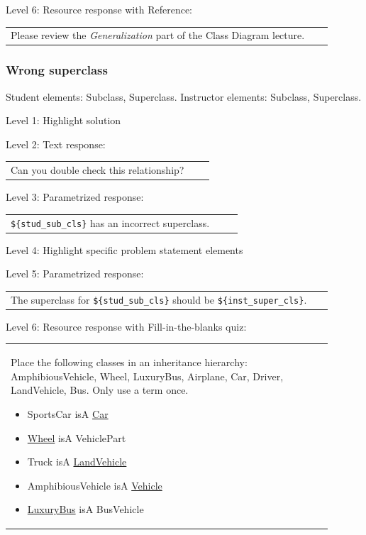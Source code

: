 \noindent Level 6: Resource response with Reference: \medskip

\begin{tabular}{|p{0.9\linewidth}}
Please review the \textit{Generalization} part of the Class Diagram lecture.
\end{tabular} \medskip


\subsubsection{Wrong superclass}

Student elements: Subclass, Superclass. Instructor elements: Subclass, Superclass. \medskip

\noindent Level 1: Highlight solution  \medskip

\noindent Level 2: Text response: \medskip

\begin{tabular}{|p{0.9\linewidth}}
Can you double check this relationship?
\end{tabular} \medskip

\noindent Level 3: Parametrized response: \medskip

\begin{tabular}{|p{0.9\linewidth}}
\verb|${stud_sub_cls}| has an incorrect superclass.
\end{tabular} \medskip

\noindent Level 4: Highlight specific problem statement elements \medskip

\noindent Level 5: Parametrized response: \medskip

\begin{tabular}{|p{0.9\linewidth}}
The superclass for \verb|${stud_sub_cls}| should be \verb|${inst_super_cls}|.
\end{tabular} \medskip

\noindent Level 6: Resource response with Fill-in-the-blanks quiz: \medskip

\begin{tabular}{|p{0.9\linewidth}}

Place the following classes in an inheritance hierarchy: AmphibiousVehicle, Wheel, LuxuryBus, Airplane, Car, Driver, LandVehicle, Bus. Only use a term once.

\begin{itemize}
    \item SportsCar isA \underline{Car}
    \item \underline{Wheel} isA VehiclePart
    \item Truck isA \underline{LandVehicle}
    \item AmphibiousVehicle isA \underline{Vehicle}
    \item \underline{LuxuryBus} isA BusVehicle
\end{itemize}

\end{tabular} \medskip

